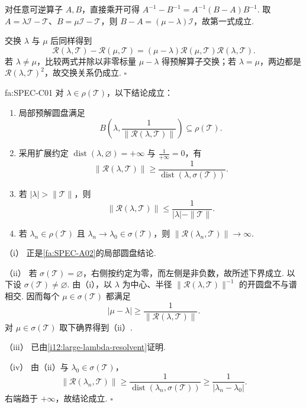 \begin{FAProof}
对任意可逆算子 \(\displaystyle A,B\)，直接乘开可得
\(\displaystyle A^{-1}-B^{-1} = A^{-1}(B-A)B^{-1}\).
取 \(\displaystyle A=\lambda\mathcal I-\mathcal T\)、\(\displaystyle B=\mu\mathcal I-\mathcal T\)，则 \(\displaystyle B-A=(\mu-\lambda)\mathcal I\)，故第一式成立.

交换 \(\displaystyle \lambda\) 与 \(\displaystyle \mu\) 后同样得到
\[
\mathcal R(\lambda,\mathcal T)
-
\mathcal R(\mu,\mathcal T)
=
(\mu-\lambda)
\mathcal R(\mu,\mathcal T)
\mathcal R(\lambda,\mathcal T).
\]
若 \(\displaystyle \lambda\neq\mu\)，比较两式并除以非零标量 \(\displaystyle \mu-\lambda\) 得预解算子交换；若 \(\displaystyle \lambda=\mu\)，两边都是 \(\displaystyle \mathcal R(\lambda,\mathcal T)^2\)，故交换关系仍成立.
\hfill\(\square\)
\end{FAProof}

\begin{FAProposition}[C][预解估计工具]{fa:SPEC-C01}
对 \(\displaystyle \lambda\in\rho(\mathcal T)\)，以下结论成立：
\begin{enumerate}[label=\textnormal{(\roman*)}]
\item 局部预解圆盘满足
\[
B\left(
\lambda,
\frac{1}{\|\mathcal R(\lambda,\mathcal T)\|}
\right)
\subseteq
\rho(\mathcal T).
\]
\item 采用扩展约定 \(\displaystyle \operatorname{dist}(\lambda,\varnothing)=+\infty\) 与 \(\displaystyle \frac{1}{+\infty}=0\)，有
\[
\|\mathcal R(\lambda,\mathcal T)\|
\geqslant
\frac{1}{\operatorname{dist}(\lambda,\sigma(\mathcal T))}.
\]
\item 若 \(\displaystyle |\lambda|>\|\mathcal T\|\)，则
\[
\|\mathcal R(\lambda,\mathcal T)\|
\leqslant
\frac{1}{|\lambda|-\|\mathcal T\|}.
\]
\item 若 \(\displaystyle \lambda_n\in\rho(\mathcal T)\) 且 \(\displaystyle \lambda_n\to\lambda_0\in\sigma(\mathcal T)\)，则
\(\displaystyle \|\mathcal R(\lambda_n,\mathcal T)\| \to\infty\).
\end{enumerate}
\end{FAProposition}

\begin{FAProof}
（i） 正是\autoref{fa:SPEC-A02}的局部圆盘结论.

（ii） 若 \(\displaystyle \sigma(\mathcal T)=\varnothing\)，右侧按约定为零，而左侧是非负数，故所述下界成立. 以下设 \(\displaystyle \sigma(\mathcal T)\neq\varnothing\). 由（i），以 \(\displaystyle \lambda\) 为中心、半径 \(\displaystyle \|\mathcal R(\lambda,\mathcal T)\|^{-1}\) 的开圆盘不与谱相交. 因而每个 \(\displaystyle \mu\in\sigma(\mathcal T)\) 都满足
\[
|\mu-\lambda|
\geqslant
\frac{1}{\|\mathcal R(\lambda,\mathcal T)\|}.
\]
对 \(\displaystyle \mu\in\sigma(\mathcal T)\) 取下确界得到（ii）.

（iii） 已由\autoref{i12:large-lambda-resolvent}证明.

（iv） 由（ii）与 \(\displaystyle \lambda_0\in\sigma(\mathcal T)\)，
\[
\|\mathcal R(\lambda_n,\mathcal T)\|
\geqslant
\frac{1}{\operatorname{dist}(\lambda_n,\sigma(\mathcal T))}
\geqslant
\frac{1}{|\lambda_n-\lambda_0|}.
\]
右端趋于 \(\displaystyle +\infty\)，故结论成立.
\hfill\(\square\)
\end{FAProof}

